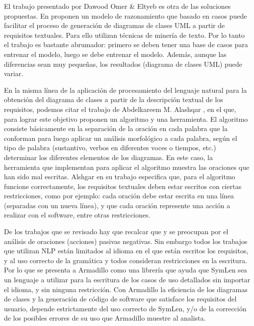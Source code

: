 El trabajo presentado por Dawood Omer \& Eltyeb \cite{Dawood2022} es otra de las soluciones propuestas. En \cite{Dawood2022} proponen un modelo de razonamiento que basado en casos puede facilitar el proceso de generación de diagramas de clases UML a partir de requisitos textuales. Para ello utilizan técnicas de minería de texto. Por lo tanto el trabajo es bastante abrumador: primero se deben tener una base de casos para entrenar el modelo, luego se debe entrenar el modelo. Además, aunque las diferencias sean muy pequeñas, los resultados (diagrama de clases UML) puede variar.

En la misma línea de la aplicación de procesamiento del lenguaje natural para la obtención del diagrama de clases a partir de la descripción textual de los requisitos, podemos citar el trabajo de Abdelkareem M. Alashqar \cite{Alashqar2021}, en el que, para lograr este objetivo proponen un algoritmo y una herramienta. El algoritmo consiste básicamente en la separación de la oración en cada palabra que la conforman para luego aplicar un análisis morfológico a cada palabra, según el tipo de palabra (sustantivo, verbos en diferentes voces o tiempos, etc.) determinar los diferentes elementos de los diagramas. En este caso, la herramienta que implementan para aplicar el algoritmo muestra las oraciones que han sido mal escritas. Alshgar en su trabajo \cite{Alashqar2021} especifica que, para el algoritmo funcione correctamente, los requisitos textuales deben estar escritos con ciertas restricciones, como por ejemplo: cada oración debe estar escrita en una línea (separadas con un nueva línea), y que cada oración represente una acción a realizar con el software, entre otras restricciones. 

De los trabajos que se revisado hay que recalcar que \cite{Alashqar2021} y \cite{Shweta2020} se preocupan por el análisis de oraciones (acciones) pasivas negativas. Sin embargo todos los trabajos que utilizan NLP están limitados al idioma en el que están escritos los requisitos, y al uso correcto de la gramática y todos consideran restricciones en la escritura. Por lo que se presenta a Armadillo como una librería que ayuda que SymLen sea un lenguaje a utilizar para la escritura de los casos de uso detallados sin importar el idioma, y sin ninguna restricción. Con Armadillo la eficiencia de los diagramas de clases y la generación de código de software que satisface los requisitos del usuario, depende estrictamente del uso correcto de SymLen, y/o de la corrección de los posibles errores de su uso que Armadillo muestre al analista.


